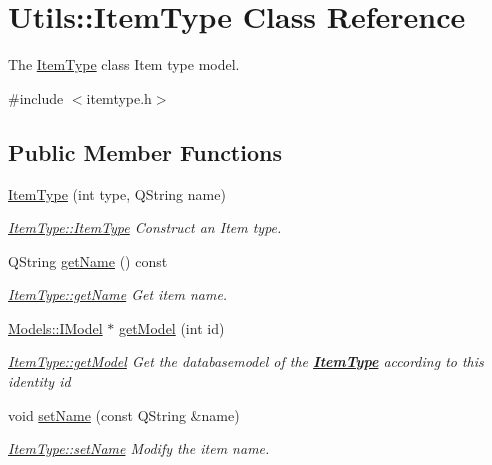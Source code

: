 \hypertarget{classUtils_1_1ItemType}{}\section{Utils\+:\+:Item\+Type Class Reference}
\label{classUtils_1_1ItemType}


The \hyperlink{classUtils_1_1ItemType}{Item\+Type} class Item type model.  




{\ttfamily \#include $<$itemtype.\+h$>$}

\subsection*{Public Member Functions}
\begin{DoxyCompactItemize}
\item 
\hyperlink{classUtils_1_1ItemType_a5b06f6c289619f01ced33db7b16ab0f9}{Item\+Type} (int type, Q\+String name)
\begin{DoxyCompactList}\small\item\em \hyperlink{classUtils_1_1ItemType_a5b06f6c289619f01ced33db7b16ab0f9}{Item\+Type\+::\+Item\+Type} Construct an Item type. \end{DoxyCompactList}\item 
Q\+String \hyperlink{classUtils_1_1ItemType_a09fdb09837ad0ab678a271d3f97dd006}{get\+Name} () const 
\begin{DoxyCompactList}\small\item\em \hyperlink{classUtils_1_1ItemType_a09fdb09837ad0ab678a271d3f97dd006}{Item\+Type\+::get\+Name} Get item name. \end{DoxyCompactList}\item 
\hyperlink{classModels_1_1IModel}{Models\+::\+I\+Model} $\ast$ \hyperlink{classUtils_1_1ItemType_aff3b98516a4ee741cf926d9cd7cbd131}{get\+Model} (int id)
\begin{DoxyCompactList}\small\item\em \hyperlink{classUtils_1_1ItemType_aff3b98516a4ee741cf926d9cd7cbd131}{Item\+Type\+::get\+Model} Get the databasemodel of the {\bfseries \hyperlink{classUtils_1_1ItemType}{Item\+Type}} according to this identity {\itshape id} \end{DoxyCompactList}\item 
void \hyperlink{classUtils_1_1ItemType_aa993c315def3988851fc3af5f826c384}{set\+Name} (const Q\+String \&name)
\begin{DoxyCompactList}\small\item\em \hyperlink{classUtils_1_1ItemType_aa993c315def3988851fc3af5f826c384}{Item\+Type\+::set\+Name} Modify the item name. \end{DoxyCompactList}\item 

\end{DoxyCompactItemize}
